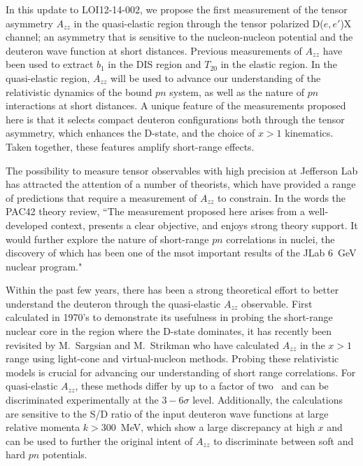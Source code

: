 In this update to LOI12-14-002, we propose the first measurement of the tensor asymmetry $A_{zz}$ in the quasi-elastic region through the tensor polarized D($e,e'$)X channel; an asymmetry that is sensitive to the nucleon-nucleon potential and the deuteron wave function at short distances.  Previous measurements of $A_{zz}$ have been used to extract $b_1$ in the DIS region and $T_{20}$ in the elastic region. In the quasi-elastic region, $A_{zz}$ will be used to advance our understanding of the relativistic dynamics of the bound $pn$ system, as well as the nature of $pn$ interactions at short distances. 
A unique feature of the measurements proposed here is that it selects compact deuteron configurations both through the tensor asymmetry, which enhances the D-state, and the choice of $x>1$ kinematics. Taken together, these features amplify short-range effects. 

The possibility to measure tensor observables with high precision at Jefferson Lab has attracted the attention of a number of theorists, which have provided a range of predictions that require a measurement of $A_{zz}$ to constrain. 
In the words the PAC42 theory review, ``The measurement proposed here arises from a well-developed context, presents a clear objective, and enjoys strong theory support. It would further explore the nature of short-range $pn$ correlations in nuclei, the discovery of which has been one of the msot important results of the JLab 6~GeV nuclear program."


Within the past few years, there has been a strong theoretical effort to better understand the deuteron through the quasi-elastic $A_{zz}$ observable. First calculated in 1970's to demonstrate its usefulness in probing the short-range nuclear core in the region where the D-state dominates, it has recently been revisited by
M.~Sargsian and M.~Strikman who have calculated $A_{zz}$ in the $x > 1$ range using light-cone and virtual-nucleon methods. Probing these relativistic models is crucial for advancing our understanding of short range correlations. For quasi-elastic $A_{zz}$, these methods differ by up to a factor of two~\cite{MISAK} and can be discriminated experimentally at the $3-6\sigma$ level. Additionally, the calculations are sensitive to the S/D ratio of the input deuteron wave functions at large relative momenta $k>300$~MeV, which show a large discrepancy at high $x$ and can be used to further the original intent of $A_{zz}$ to discriminate between soft and hard $pn$ potentials. 

